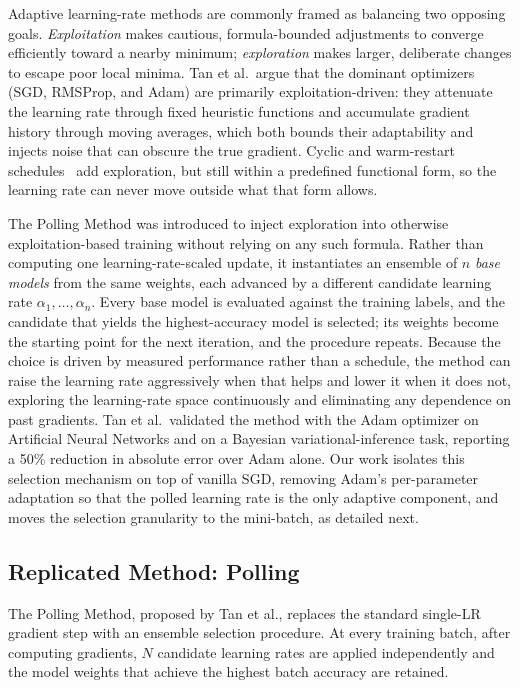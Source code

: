 \documentclass[conference]{IEEEtran}
\begin{document}
Adaptive learning-rate methods are commonly framed as balancing two opposing goals. \emph{Exploitation} makes cautious, formula-bounded adjustments to converge efficiently toward a nearby minimum; \emph{exploration} makes larger, deliberate changes to escape poor local minima. Tan et al.\ argue that the dominant optimizers (SGD, RMSProp, and Adam) are primarily exploitation-driven: they attenuate the learning rate through fixed heuristic functions and accumulate gradient history through moving averages, which both bounds their adaptability and injects noise that can obscure the true gradient. Cyclic and warm-restart schedules~\cite{smith2017cyclical, loshchilov2017sgdr} add exploration, but still within a predefined functional form, so the learning rate can never move outside what that form allows.

The Polling Method was introduced to inject exploration into otherwise exploitation-based training without relying on any such formula. Rather than computing one learning-rate-scaled update, it instantiates an ensemble of $n$ \emph{base models} from the same weights, each advanced by a different candidate learning rate $\alpha_1, \ldots, \alpha_n$. Every base model is evaluated against the training labels, and the candidate that yields the highest-accuracy model is selected; its weights become the starting point for the next iteration, and the procedure repeats. Because the choice is driven by measured performance rather than a schedule, the method can raise the learning rate aggressively when that helps and lower it when it does not, exploring the learning-rate space continuously and eliminating any dependence on past gradients. Tan et al.\ validated the method with the Adam optimizer on Artificial Neural Networks and on a Bayesian variational-inference task, reporting a 50\% reduction in absolute error over Adam alone. Our work isolates this selection mechanism on top of vanilla SGD, removing Adam's per-parameter adaptation so that the polled learning rate is the only adaptive component, and moves the selection granularity to the mini-batch, as detailed next.

\subsection{Replicated Method: Polling}

The Polling Method, proposed by Tan et al., replaces the standard single-LR gradient step with an ensemble selection procedure. At every training batch, after computing gradients, $N$ candidate learning rates are applied independently and the model weights that achieve the highest batch accuracy are retained.
\end{document}
